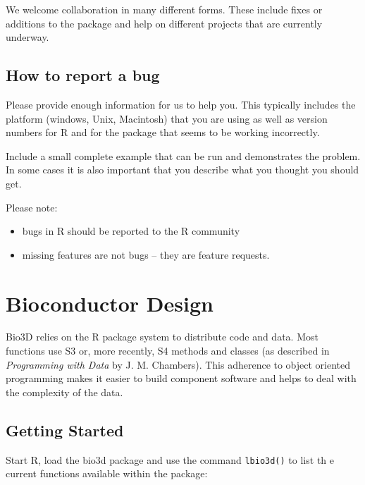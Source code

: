 \documentclass[letter]{article}
\begin{document}
We welcome collaboration in many different forms. These include fixes or additions to the package and help on different projects that are currently underway.


\subsection{How to report a bug}

Please provide enough information for us to help you. This typically
includes the platform (windows, Unix, Macintosh) that you are using as
well as version numbers for R and for the package that seems to be
working incorrectly.

Include a small complete example that can be run and demonstrates the
problem. In some cases it is also important that you describe what you
thought you should get.

Please note:
\begin{itemize}
\item bugs in R should be reported to the R community
\item missing features are not bugs -- they are feature requests.
\end{itemize}

\section{Bioconductor Design}

Bio3D relies on the R package system to distribute code and
data. Most functions use S3 or, more recently, S4 methods and classes (as described in {\em
  Programming with Data} by J. M. Chambers). This adherence to object
oriented programming makes it easier to build component software and
helps to deal with the complexity of the data.


\subsection{Getting Started}
Start R, load the bio3d package and use the command \texttt{lbio3d()} to list th
e current functions available within the package:
\end{document}
